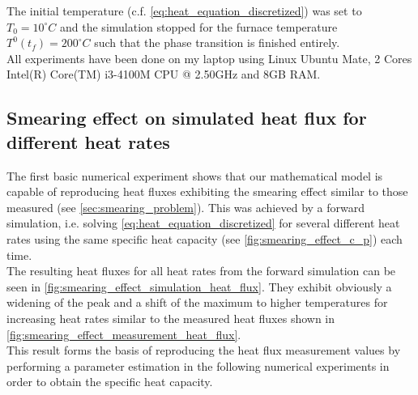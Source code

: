 \documentclass{scrartcl}[12pt, halfparskip]
\numberwithin{equation}{section}
\numberwithin{figure}{section}
\numberwithin{table}{section}
\begin{document}
The initial temperature (c.f. \cref{eq:heat_equation_discretized}) was set to $T_0=10^\circ C$ and the simulation stopped for the furnace temperature $T^0(t_f)=200^\circ C$ such that the phase transition is finished entirely. \\


All experiments have been done on my laptop using Linux Ubuntu Mate, 2 Cores Intel(R) Core(TM) i3-4100M CPU @ 2.50GHz and 8GB RAM. 


\subsection{Smearing effect on simulated heat flux for different heat rates}
The first basic numerical experiment shows that our mathematical model is capable of reproducing heat fluxes exhibiting the smearing effect similar to those measured (see \cref{sec:smearing_problem}). This was achieved by a forward simulation, i.e. solving \cref{eq:heat_equation_discretized} for several different heat rates using the same specific heat capacity (see \cref{fig:smearing_effect_c_p}) each time. \\
The resulting heat fluxes for all heat rates from the forward simulation can be seen in \cref{fig:smearing_effect_simulation_heat_flux}. They exhibit obviously a widening of the peak and a shift of the maximum to higher temperatures for increasing heat rates similar to the measured heat fluxes shown in \cref{fig:smearing_effect_measurement_heat_flux}. \\
This result forms the basis of reproducing the heat flux measurement values by performing a parameter estimation in the following numerical experiments in order to obtain the specific heat capacity.\\
\end{document}
